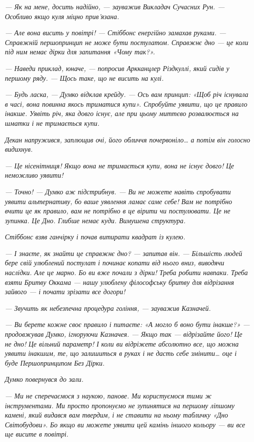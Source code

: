 \documentclass[12pt, a4paper, openany]{book}
\begin{document}
\begin{terrybox}
\textit{--- Як на мене, досить надійно, --- зауважив Викладач Сучасних Рун. --- Особливо якщо куля міцно прив'язана.}

\textit{--- Але вона висить у повітрі! --- Стіббонс енергійно замахав руками. --- Справжній першопринцип не може бути постулатом. Справжнє дно --- це коли під ним немає дірки для запитання «Чому так?».}

\textit{--- Наведи приклад, юначе, --- попросив Аркканцлер Різдкуллі, який сидів у першому ряду. --- Щось таке, що не висить на кулі.}

\textit{--- Будь ласка, --- Думко відклав крейду. --- Ось вам принцип: «Щоб річ існувала в часі, вона повинна якось триматися купи». Спробуйте уявити, що це правило інакше. Уявіть річ, яка довго існує, але при цьому миттєво розвалюється на шматки і не тримається купи.}

\textit{Декан напружився, заплющив очі, його обличчя почервоніло\ldots{} а потім він голосно видихнув.}

\textit{--- Це нісенітниця! Якщо вона не тримається купи, вона не існує довго! Це неможливо уявити!}

\textit{--- Точно! --- Думко аж підстрибнув. --- Ви не можете навіть спробувати уявити альтернативу, бо ваше уявлення ламає саме себе! Вам не потрібно вчити це як правило, вам не потрібно в це вірити чи постулювати. Це не зупинка. Це Дно. Глибше немає куди. Вимушена структура.}

\textit{Стіббонс взяв ганчірку і почав витирати квадрат із кулею.}

\textit{--- І знаєте, як знайти це справжнє дно? --- запитав він. --- Більшість людей бере свій улюблений постулат і починає копати від нього вниз, виводячи наслідки. Але це марно. Бо ви вже почали з дірки! Треба робити навпаки. Треба взяти Бритву Оккама --- нашу улюблену філософську бритву для відрізання зайвого --- і почати зрізати все догори!}

\textit{--- Звучить як небезпечна процедура гоління, --- зауважив Казначей.}

\textit{--- Ви берете кожне своє правило і питаєте: «А могло б воно бути інакше?» --- продовжував Думко, ігноруючи Казначея. --- Якщо так --- відрізайте його! Це не дно! Це вільний параметр! І коли ви відріжете абсолютно все, що можна уявити інакшим, те, що залишиться в руках і не дасть себе змінити\ldots{} оце і буде Першопринципом Без Дірки.}

\textit{Думко повернувся до зали.}

\textit{--- Ми не сперечаємося з наукою, панове. Ми користуємося тими ж інструментами. Ми просто пропонуємо не зупинятися на першому ліпшому камені, який видався вам твердим, і не ставити на ньому табличку «Дно Світобудови». Бо якщо ви можете уявити цей камінь іншого кольору --- ви все ще висите в повітрі.}


\end{terrybox}
\end{document}
